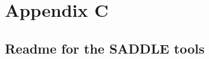 \appendix

\chapter{Appendix C}
\label{appendix:ReadmeII}
\section{Readme for the SADDLE tools}

      
      
      
      
